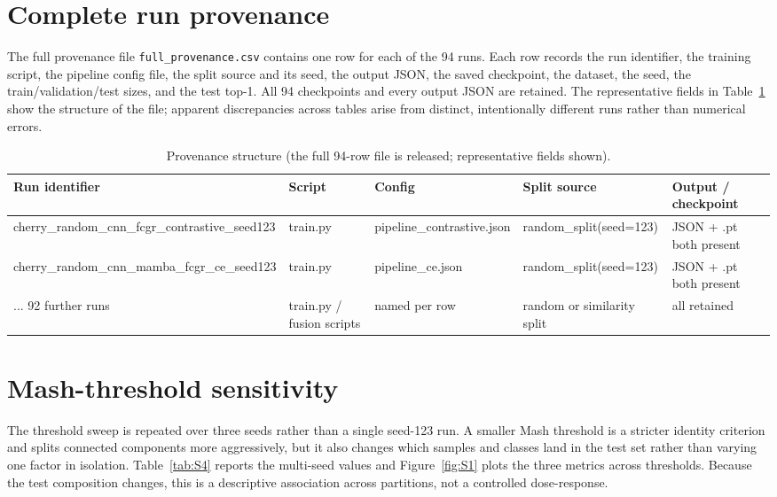 \documentclass[utf8]{frontiers_suppmat}
\begin{document}
\section{Complete run provenance}

The full provenance file \texttt{full\_provenance.csv} contains one row for each of the 94
runs. Each row records the run identifier, the training script, the pipeline config file, the
split source and its seed, the output JSON, the saved checkpoint, the dataset, the seed, the
train/validation/test sizes, and the test top-1. All 94 checkpoints and every output JSON are
retained. The representative fields in Table~\ref{tab:S3} show the structure of the file;
apparent discrepancies across tables arise from distinct, intentionally different runs rather
than numerical errors.

\begin{table}[ht]
\centering
\renewcommand{\arraystretch}{1.3}
\caption{Provenance structure (the full 94-row file is released; representative fields shown).}\label{tab:S3}
\footnotesize
\begin{tabular}{p{3.6cm} p{2.2cm} p{2.7cm} p{2.7cm} p{2.9cm}}
\hline
Run identifier & Script & Config & Split source & Output / checkpoint \\
\hline
cherry\_random\_cnn\_fcgr\_contrastive\_seed123 & train.py & pipeline\_contrastive.json & random\_split(seed=123) & JSON + .pt both present \\
cherry\_random\_cnn\_mamba\_fcgr\_ce\_seed123 & train.py & pipeline\_ce.json & random\_split(seed=123) & JSON + .pt both present \\
... 92 further runs & train.py / fusion scripts & named per row & random or similarity split & all retained \\
\hline
\end{tabular}
\end{table}

\section{Mash-threshold sensitivity}

The threshold sweep is repeated over three seeds rather than a single seed-123 run. A smaller
Mash threshold is a stricter identity criterion and splits connected components more
aggressively, but it also changes which samples and classes land in the test set rather than
varying one factor in isolation. Table~\ref{tab:S4} reports the multi-seed values and
Figure~\ref{fig:S1} plots the three metrics across thresholds. Because the test composition
changes, this is a descriptive association across partitions, not a controlled dose-response.
\end{document}
